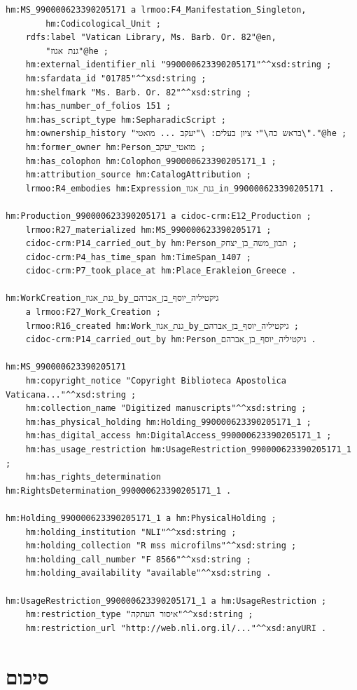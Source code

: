 \documentclass[12pt,a4paper]{article}
\begin{document}
\begin{lstlisting}[style=ttl]
hm:MS_990000623390205171 a lrmoo:F4_Manifestation_Singleton,
        hm:Codicological_Unit ;
    rdfs:label "Vatican Library, Ms. Barb. Or. 82"@en,
        "גנת אגוז"@he ;
    hm:external_identifier_nli "990000623390205171"^^xsd:string ;
    hm:sfardata_id "01785"^^xsd:string ;
    hm:shelfmark "Ms. Barb. Or. 82"^^xsd:string ;
    hm:has_number_of_folios 151 ;
    hm:has_script_type hm:SepharadicScript ;
    hm:ownership_history "בראש כה\"י ציון בעלים: \"יעקב ... מואטי\"."@he ;
    hm:former_owner hm:Person_מואטי_יעקב ;
    hm:has_colophon hm:Colophon_990000623390205171_1 ;
    hm:attribution_source hm:CatalogAttribution ;
    lrmoo:R4_embodies hm:Expression_גנת_אגוז_in_990000623390205171 .

hm:Production_990000623390205171 a cidoc-crm:E12_Production ;
    lrmoo:R27_materialized hm:MS_990000623390205171 ;
    cidoc-crm:P14_carried_out_by hm:Person_תבון_משה_בן_יצחק ;
    cidoc-crm:P4_has_time_span hm:TimeSpan_1407 ;
    cidoc-crm:P7_took_place_at hm:Place_Erakleion_Greece .

hm:WorkCreation_גנת_אגוז_by_גיקטיליה_יוסף_בן_אברהם 
    a lrmoo:F27_Work_Creation ;
    lrmoo:R16_created hm:Work_גנת_אגוז_by_גיקטיליה_יוסף_בן_אברהם ;
    cidoc-crm:P14_carried_out_by hm:Person_גיקטיליה_יוסף_בן_אברהם .

hm:MS_990000623390205171 
    hm:copyright_notice "Copyright Biblioteca Apostolica Vaticana..."^^xsd:string ;
    hm:collection_name "Digitized manuscripts"^^xsd:string ;
    hm:has_physical_holding hm:Holding_990000623390205171_1 ;
    hm:has_digital_access hm:DigitalAccess_990000623390205171_1 ;
    hm:has_usage_restriction hm:UsageRestriction_990000623390205171_1 ;
    hm:has_rights_determination hm:RightsDetermination_990000623390205171_1 .

hm:Holding_990000623390205171_1 a hm:PhysicalHolding ;
    hm:holding_institution "NLI"^^xsd:string ;
    hm:holding_collection "R mss microfilms"^^xsd:string ;
    hm:holding_call_number "F 8566"^^xsd:string ;
    hm:holding_availability "available"^^xsd:string .

hm:UsageRestriction_990000623390205171_1 a hm:UsageRestriction ;
    hm:restriction_type "איסור העתקה"^^xsd:string ;
    hm:restriction_url "http://web.nli.org.il/..."^^xsd:anyURI .
\end{lstlisting}

\section{סיכום}
\end{document}
